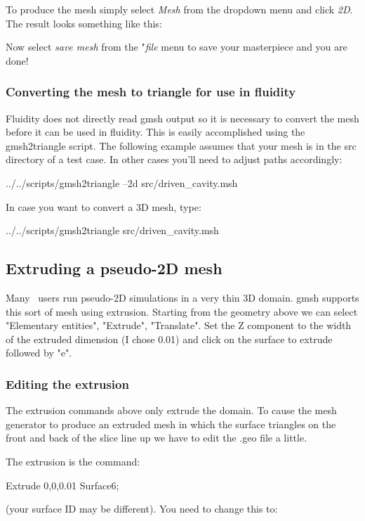 To produce the mesh simply select \textit{Mesh} from the dropdown menu and click \textit{2D}. The result looks something like this:


Now select \textit{save mesh} from the "\textit{file} menu to save your masterpiece and you are done!

\subsubsection{Converting the mesh to triangle for use in fluidity}

Fluidity does not directly read gmsh output so it is necessary to convert the mesh before it can be used in fluidity. This is easily accomplished using the gmsh2triangle script. The following example assumes that your mesh is in the src directory of a test case. In other cases you'll need to adjust paths accordingly:

 ../../scripts/gmsh2triangle --2d src/driven\_cavity.msh

In case you want to convert a 3D mesh, type:

 ../../scripts/gmsh2triangle src/driven\_cavity.msh

\subsection{Extruding a pseudo-2D mesh}

Many \fluidity\ users run pseudo-2D simulations in a very thin 3D domain.
gmsh supports this sort of mesh using extrusion. Starting from the geometry
above we can select "Elementary entities", "Extrude", "Translate". Set the Z
component to the width of the extruded dimension (I chose 0.01) and click on
the surface to extrude followed by "e".

\subsubsection{Editing the extrusion}

The extrusion commands above only extrude the domain. To cause the mesh
generator to produce an extruded mesh in which the surface triangles on the
front and back of the slice line up we have to edit the .geo file a little.

The extrusion is the command:

 Extrude {0,0,0.01} {
  Surface{6};
 }

(your surface ID may be different). You need to change this to:

